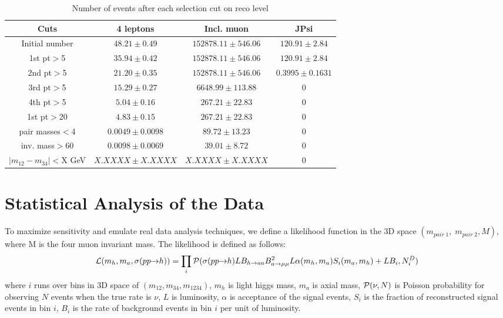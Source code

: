 \documentclass[aps,prd,onecolumn,superscriptaddress,showpacs]{revtex4}
\begin{document}
\begin{table}[t]
\caption{Number of events after each selection cut on reco level\label{bckgr_cuts_number_reco_level}}
\begin{center}
\begin{tabular}{|c|c|c|c|}
\hline
Cuts & 4 leptons & Incl. muon & JPsi \\ 
\hline
Initial number&            $48.21\pm0.49$    &    $152878.11\pm546.06$    &    $120.91\pm2.84$   \\ 
1st pt$>$5&                $35.94\pm0.42$    &    $152878.11\pm546.06$    &    $120.91\pm2.84$   \\ 
2nd pt$>$5&                $21.20\pm0.35$    &    $152878.11\pm546.06$    &    $0.3995\pm0.1631$ \\ 
3rd pt$>$5&                $15.29\pm0.27$    &    $6648.99\pm113.88$      &    $0$      \\ 
4th pt$>$5&                $5.04\pm0.16$     &    $267.21\pm22.83$        &    $0$      \\ 
1st pt$>$20&               $4.83\pm0.15$     &    $267.21\pm22.83$        &    $0$      \\ 
\hline
pair masses$<$4&           $0.0049\pm0.0098$ &    $89.72\pm13.23$         &    $0$      \\ 
inv. mass$>$60 &           $0.0098\pm0.0069$ &    $39.01\pm8.72$          &    $0$      \\ 
$|m_{12}-m_{34}|<$X GeV &  $X.XXXX\pm X.XXXX$ &    $X.XXXX\pm X.XXXX$       &    $0$    \\ 
\hline
\end{tabular}
\end{center}
\end{table}




\section{Statistical Analysis of the Data}

To maximize sensitivity and emulate real data analysis techniques, we define a likelihood function in the 3D space 
$(m_{pair \; 1}, \; m_{pair \; 2}, M)$, where M is the four muon invariant mass. The likelihood is defined as follows:
\begin{eqnarray}
{\cal L}(m_h, m_a, \sigma(pp \to h)) = \prod_i {\cal P}(\sigma(pp \to h) L B_{h \to aa} B^2_{a \to \mu \mu} L
\alpha(m_h, m_a) S_i (m_a, m_h) + L B_i, N^D_i)
\end{eqnarray}
where $i$ runs over bins in 3D space of $(m_{12}, m_{34}, m_{1234})$, $m_h$ is light higgs mass, $m_a$ is 
axial mass, ${\cal P}(\nu, N)$ is Poisson probability for observing $N$ events when the true rate is $\nu$, $L$ 
is luminosity, $\alpha$ is acceptance of the signal events, $S_i$ is the fraction of reconstructed signal events 
in bin $i$, $B_i$ is the rate of background events in bin $i$ per unit of luminosity.
\end{document}
